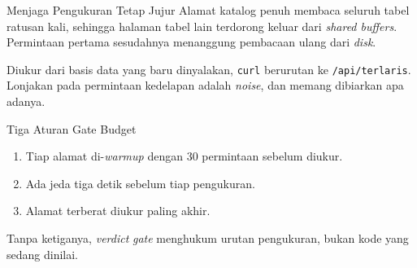 \documentclass[aspectratio=169, table, 12pt]{beamer}
\begin{document}
\begin{frame}{{\Large Menjaga Pengukuran Tetap Jujur}}
  \vspace{4pt}
  {\small Alamat katalog penuh membaca seluruh tabel ratusan kali, sehingga
  halaman tabel lain terdorong keluar dari \textit{shared buffers}. Permintaan
  pertama sesudahnya menanggung pembacaan ulang dari \textit{disk}.}
  \vspace{2pt}
  \centering

  \vspace{2pt}
  {\footnotesize Diukur dari basis data yang baru dinyalakan, \texttt{curl}
  berurutan ke \texttt{/api/terlaris}. Lonjakan pada permintaan kedelapan
  adalah \textit{noise}, dan memang dibiarkan apa adanya.}
\end{frame}

\begin{frame}{{\Large Tiga Aturan Gate Budget}}
  \vspace{14pt}
  \begin{enumerate}
    \item Tiap alamat di-\textit{warmup} dengan 30 permintaan sebelum diukur.
    \item Ada jeda tiga detik sebelum tiap pengukuran.
    \item Alamat terberat diukur paling akhir.
  \end{enumerate}
  \vspace{10pt}
  {\small Tanpa ketiganya, \textit{verdict} \textit{gate} menghukum urutan pengukuran,
  bukan kode yang sedang dinilai.}
\end{frame}
\end{document}
